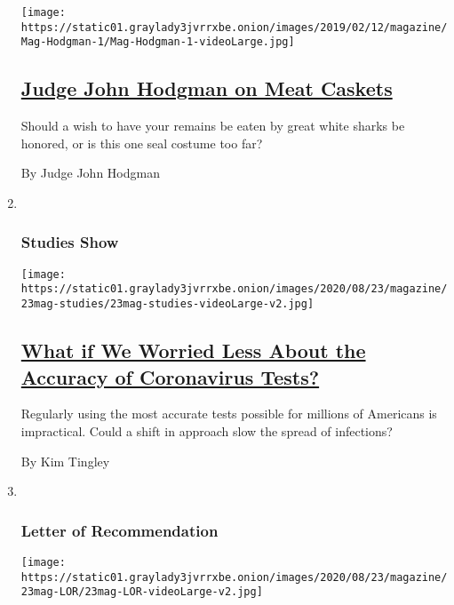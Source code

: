\begin{enumerate}
  \texttt{[image: https://static01.graylady3jvrrxbe.onion/images/2019/02/12/magazine/Mag-Hodgman-1/Mag-Hodgman-1-videoLarge.jpg]}

  \hypertarget{judge-john-hodgman-on-meat-caskets}{%
  \subsection{\texorpdfstring{\href{/2020/08/20/magazine/judge-john-hodgman-on-meat-caskets.html}{Judge
  John Hodgman on Meat
  Caskets}}{Judge John Hodgman on Meat Caskets}}\label{judge-john-hodgman-on-meat-caskets}}

  Should a wish to have your remains be eaten by great white sharks be
  honored, or is this one seal costume too far?

  By Judge John Hodgman
\item ~
  \hypertarget{studies-show}{%
  \subsubsection{Studies Show}\label{studies-show}}

  \texttt{[image: https://static01.graylady3jvrrxbe.onion/images/2020/08/23/magazine/23mag-studies/23mag-studies-videoLarge-v2.jpg]}

  \hypertarget{what-if-we-worried-less-about-the-accuracy-of-coronavirus-tests}{%
  \subsection{\texorpdfstring{\href{/2020/08/20/magazine/what-if-we-worried-less-about-the-accuracy-of-coronavirus-tests.html}{What
  if We Worried Less About the Accuracy of Coronavirus
  Tests?}}{What if We Worried Less About the Accuracy of Coronavirus Tests?}}\label{what-if-we-worried-less-about-the-accuracy-of-coronavirus-tests}}

  Regularly using the most accurate tests possible for millions of
  Americans is impractical. Could a shift in approach slow the spread of
  infections?

  By Kim Tingley
\item ~
  \hypertarget{letter-of-recommendation}{%
  \subsubsection{Letter of
  Recommendation}\label{letter-of-recommendation}}

  \texttt{[image: https://static01.graylady3jvrrxbe.onion/images/2020/08/23/magazine/23mag-LOR/23mag-LOR-videoLarge-v2.jpg]}


\end{enumerate}
